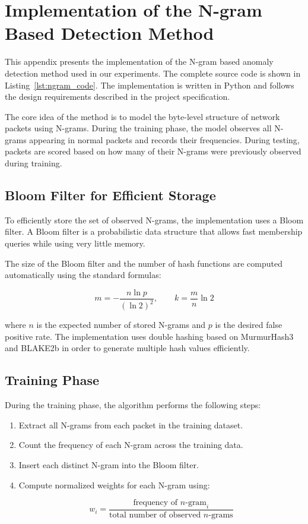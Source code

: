\section{Implementation of the N-gram Based Detection Method}

This appendix presents the implementation of the N-gram based anomaly detection method used in our experiments. The complete source code is shown in Listing~\ref{lst:ngram_code}. The implementation is written in Python and follows the design requirements described in the project specification.

The core idea of the method is to model the byte-level structure of network packets using N-grams. During the training phase, the model observes all N-grams appearing in normal packets and records their frequencies. During testing, packets are scored based on how many of their N-grams were previously observed during training.

\subsection{Bloom Filter for Efficient Storage}

To efficiently store the set of observed N-grams, the implementation uses a Bloom filter. A Bloom filter is a probabilistic data structure that allows fast membership queries while using very little memory. 

The size of the Bloom filter and the number of hash functions are computed automatically using the standard formulas:

\[
m = -\frac{n \ln p}{(\ln 2)^2}, \qquad
k = \frac{m}{n} \ln 2
\]

where $n$ is the expected number of stored N-grams and $p$ is the desired false positive rate. The implementation uses double hashing based on MurmurHash3 and BLAKE2b in order to generate multiple hash values efficiently.

\subsection{Training Phase}

During the training phase, the algorithm performs the following steps:

\begin{enumerate}

\item Extract all N-grams from each packet in the training dataset.

\item Count the frequency of each N-gram across the training data.

\item Insert each distinct N-gram into the Bloom filter.

\item Compute normalized weights for each N-gram using:

\[
w_i = \frac{\text{frequency of } n\text{-gram}_i}{\text{total number of observed } n\text{-grams}}
\]

\end{enumerate}

